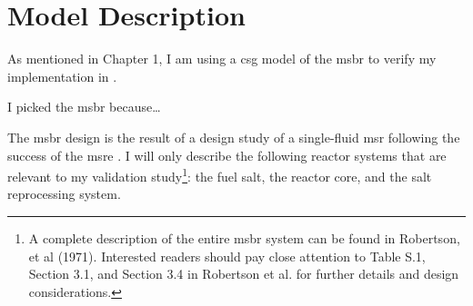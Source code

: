 \chapter{Model Description}
\label{ch:chapter4}
As mentioned in Chapter 1, I am using a \Gls{csg} model of the \Gls{msbr}
\cite{robertson_conceptual_1971} to verify my \OpenMC implementation in
\SaltProc.

I picked the \Gls{msbr} because\ldots 

The \Gls{msbr} design is the result of a design study of a single-fluid
\Gls{msr} following the success of the \Gls{msre}
\cite{haubenreich_experience_1970}\cite{rosenthal_molten-salt_1970}.
I will only describe the following reactor systems that are relevant to
my validation study\footnote{A complete description of the entire \Gls{msbr}
system can be found in Robertson, et al (1971)\cite{robertson_conceptual_1971}.
Interested readers should pay close attention to Table S.1, Section 3.1, and
Section 3.4 in Robertson et al. for further details and design considerations.}:
the fuel salt, the reactor core, and the salt reprocessing system.


